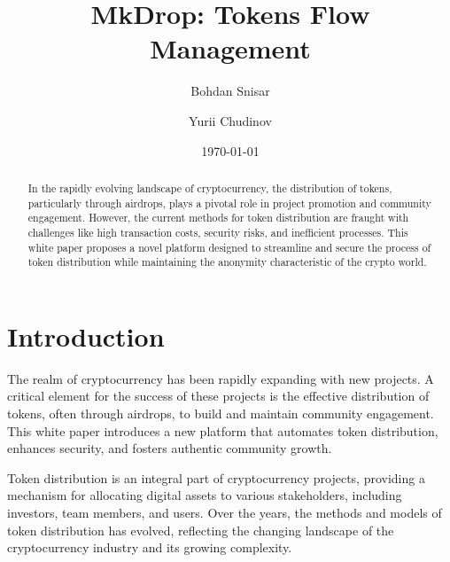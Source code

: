 \documentclass[12pt,oneside]{article}
\date{\small\today}
\title{%
  MkDrop: Tokens Flow Management\\
  \colorbox{mypink}{\small\sffamily\color{white}{White Paper}}}
\author{Bohdan Snisar \and Yurii Chudinov} %
\begin{document}
\raggedbottom

\maketitle
\begin{abstract}
  In the rapidly evolving landscape of cryptocurrency, the distribution of tokens, 
  particularly through airdrops, plays a pivotal role in project promotion 
  and community engagement. However, the current methods for token distribution 
  are fraught with challenges like high transaction costs, security risks, and 
  inefficient processes. This white paper proposes a novel platform designed to 
  streamline and secure the process of token distribution while maintaining the 
  anonymity characteristic of the crypto world.
\end{abstract}


\section{Introduction}
The realm of cryptocurrency has been rapidly expanding with new projects.
A critical element for the success of these projects is the effective distribution of tokens, often through
airdrops, to build and maintain community engagement. This white paper introduces 
a new platform that automates token distribution, enhances security, and 
fosters authentic community growth.

Token distribution is an integral part of cryptocurrency projects, providing a mechanism 
for allocating digital assets to various stakeholders, including investors, team members, and users.
 Over the years, the methods and models of 
token distribution has evolved, reflecting the changing landscape of the 
cryptocurrency industry and its growing complexity. 
\end{document}
